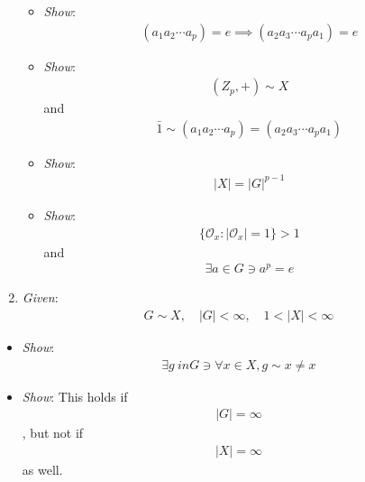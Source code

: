 \begin{enumerate}
  \begin{itemize}
  \tightlist
  \item
    \emph{Show}: \begin{align*}
    (a_1 a_2\cdots a_p) = e \implies (a_2 a_3 \cdots a_p a_1) = e\end{align*}
  \item
    \emph{Show}: \begin{align*}
    (Z_p, +) \sim X\end{align*}
     and \begin{align*}
    \bar 1 \sim (a_1 a_2 \cdots a_p) = (a_2 a_3 \cdots a_p a_1)\end{align*}
  \item
    \emph{Show}: \begin{align*}
    |X| = |G|^{p-1}\end{align*}
  \item
    \emph{Show}: \begin{align*}
    \{ \mathcal{O}_x : |\mathcal{O}_x| = 1 \} > 1\end{align*}
     and \begin{align*}
    \exists a \in G \ni a^p = e\end{align*}
  \end{itemize}
\item
  \emph{Given}: \begin{align*}
  G \sim X, \quad |G| < \infty , \quad 1 < |X| < \infty\end{align*}
\end{enumerate}

\begin{itemize}
\tightlist
\item
  \emph{Show}: \begin{align*}
  \exists g\ in G \ni \forall x\in X, g\sim x \neq x\end{align*}
\item
  \emph{Show}: This holds if \begin{align*}
  |G| = \infty\end{align*}
  , but not if \begin{align*}
  |X| = \infty\end{align*}
   as well.
\end{itemize}

